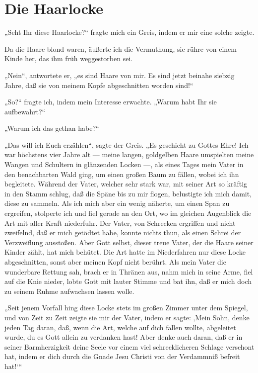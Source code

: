 \chapter{Die Haarlocke}

„Seht Ihr diese Haarlocke?“ fragte mich ein Greis, indem er mir eine solche zeigte.

Da die Haare blond waren, äußerte ich die Vermuthung, sie rühre von einem Kinde her, das ihm früh weggestorben sei.

„Nein“, antwortete er, „es sind Haare von mir. Es sind jetzt beinahe siebzig Jahre, daß sie von meinem Kopfe abgeschnitten worden sind!“

„So?“ fragte ich, indem mein Interesse erwachte. „Warum habt Ihr sie aufbewahrt?“

„Warum ich das gethan habe?“

„Das will ich Euch erzählen“, sagte der Greis. „Es geschieht zu Gottes Ehre! Ich war höchstens vier Jahre alt — meine langen, goldgelben Haare umspielten meine Wangen und Schultern in glänzenden Locken —, als eines Tages mein Vater in den benachbarten Wald ging, um einen großen Baum zu fällen, wobei ich ihn begleitete. Während der Vater, welcher sehr stark war, mit seiner Art so kräftig in den Stamm schlug, daß die Späne bis zu mir flogen, belustigte ich mich damit, diese zu sammeln. Als ich mich aber ein wenig näherte, um einen Span zu ergreifen, stolperte ich und fiel gerade an den Ort, wo im gleichen Augenblick die Art mit aller Kraft niederfuhr. Der Vater, von Schrecken ergriffen und nicht zweifelnd, daß er mich getödtet habe, konnte nichts thun, als einen Schrei der Verzweiflung ausstoßen. Aber Gott selbst, dieser treue Vater, der die Haare seiner Kinder zählt, hat mich behütet. Die Art hatte im Niederfahren nur diese Locke abgeschnitten, sonst aber meinen Kopf nicht berührt. Als mein Vater die wunderbare Rettung sah, brach er in Thränen aus, nahm mich in seine Arme, fiel auf die Knie nieder, lobte Gott mit lauter Stimme und bat ihn, daß er mich doch zu seinem Ruhme aufwachsen lassen wolle.

„Seit jenem Vorfall hing diese Locke stets im großen Zimmer unter dem Spiegel, und von Zeit zu Zeit zeigte sie mir der Vater, indem er sagte: ‚Mein Sohn, denke jeden Tag daran, daß, wenn die Art, welche auf dich fallen wollte, abgeleitet wurde, du es Gott allein zu verdanken hast! Aber denke auch daran, daß er in seiner Barmherzigkeit deine Seele vor einem viel schrecklicheren Schlage verschont hat, indem er dich durch die Gnade Jesu Christi von der Verdammniß befreit hat!‘“
